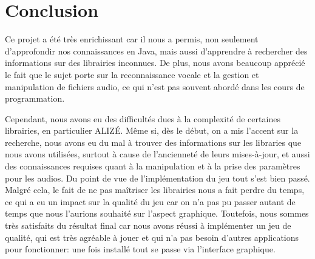 \section{Conclusion}
\label{sec:conclusion}

Ce projet a été très enrichissant car il nous a permis, non seulement d'approfondir nos connaissances en Java, mais aussi d'apprendre à rechercher des
informations sur des librairies inconnues. De plus, nous avons beaucoup apprécié le fait que le sujet porte sur la reconnaissance vocale et la gestion et
manipulation de fichiers audio, ce qui n'est pas souvent abordé dans les cours de programmation.

Cependant, nous avons eu des difficultés dues à la complexité de certaines librairies, en particulier ALIZÉ. Même si, dès le début, on a mis l'accent sur la
recherche, nous avons eu du mal à trouver des informations sur les libraries que nous avons utilisées, surtout à cause de l'ancienneté de leurs mises-à-jour, et aussi des connaissances requises quant à la manipulation et à la prise des paramètres pour les audios.
Du point de vue de l'implémentation du jeu tout s'est bien passé. Malgré cela, le fait de ne pas maîtriser les librairies nous a fait perdre du temps, ce qui
a eu un impact sur la qualité du jeu car on n'a pas pu passer autant de temps que nous l'aurions souhaité sur l'aspect graphique. Toutefois, nous sommes
très satisfaits du résultat final car nous avons réussi à implémenter un jeu de qualité, qui est très agréable à jouer et qui n'a pas besoin d'autres
applications pour fonctionner: une fois installé tout se passe via l'interface graphique.

